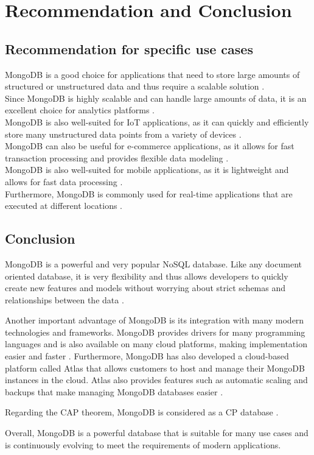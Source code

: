 
\section{Recommendation and Conclusion}

\subsection{Recommendation for specific use cases}
MongoDB is a good choice for applications that need to store large amounts of structured or %
unstructured data and thus require a scalable solution \parencite{Mongo-Why}.
\\
Since MongoDB is highly scalable and can handle large amounts of data, it is an excellent choice for analytics platforms \parencite{Mongo-Scale}. 
\\
MongoDB is also well-suited for IoT applications, as it can quickly and efficiently store many unstructured 
data points from a variety of devices \parencite{Mongo-IoT}.
\\
MongoDB can also be useful for e-commerce applications, as it allows for fast transaction 
processing and provides flexible data modeling \parencite{Mongo-E-Commerce}. 
\\
MongoDB is also well-suited for mobile applications, as it is lightweight and allows for fast data processing \parencite{Mongo-Mobile}. 
\\
Furthermore, MongoDB is commonly used for real-time applications that are executed at different locations \parencite{Jayasekara2021}.

\subsection{Conclusion}
MongoDB is a powerful and very popular NoSQL database. Like any document oriented database,
it is very flexibility and thus allows developers to quickly create new features and models 
without worrying about strict schemas and relationships between the data \parencite{Mongo-Scale}. 

Another important advantage of MongoDB is its integration with many modern technologies and 
frameworks. MongoDB provides drivers for many programming languages and is also available on many 
cloud platforms, making implementation easier and faster \parencite{Mongo-Integration}. 
Furthermore, MongoDB has also developed a cloud-based platform called Atlas that allows customers 
to host and manage their MongoDB instances in the cloud. Atlas also provides features such as 
automatic scaling and backups that make managing MongoDB databases easier \parencite{Mongo-Deploy-database}.

Regarding the CAP theorem, MongoDB is considered as a CP database \parencite{Jayasekara2021}.

Overall, MongoDB is a powerful database that is suitable for many use cases 
and is continuously evolving to meet the requirements of modern applications.
